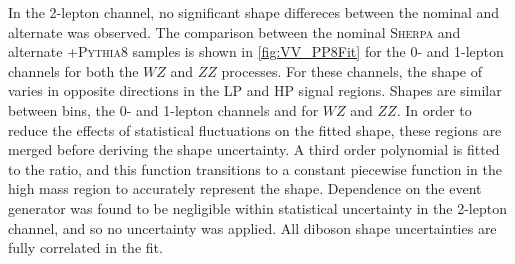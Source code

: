 In the 2-lepton channel, no significant shape differeces between the nominal and alternate was observed.
The comparison between the nominal \textsc{Sherpa} and alternate \POWHEG{}+\textsc{Pythia8} samples is shown in \cref{fig:VV_PP8Fit} for the 0- and 1-lepton channels for both the $WZ$ and $ZZ$ processes.
For these channels, the shape of \mJ varies in opposite directions in the LP and HP signal regions.
Shapes are similar between \ptv bins, the 0- and 1-lepton channels and for $WZ$ and $ZZ$.
In order to reduce the effects of statistical fluctuations on the fitted shape, these regions are merged before deriving the shape uncertainty.
A third order polynomial is fitted to the ratio, and this function transitions to a constant piecewise function in the high mass region to accurately represent the shape.
Dependence on the event generator was found to be negligible within statistical uncertainty in the 2-lepton channel, and so no uncertainty was applied.
All diboson shape uncertainties are fully correlated in the fit.

